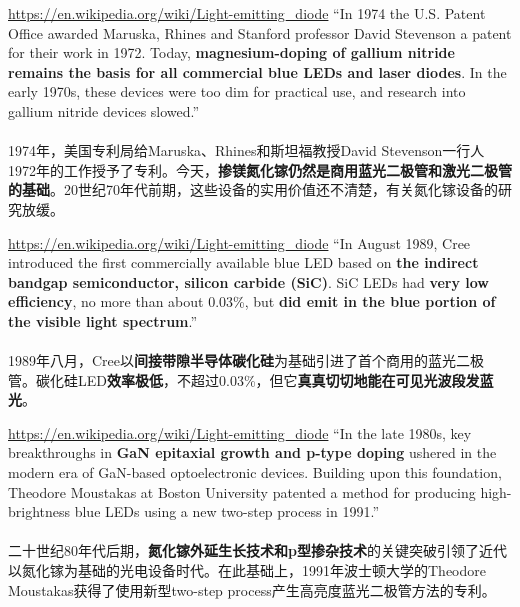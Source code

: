 \begin{slide}{\url{https://en.wikipedia.org/wiki/Light-emitting_diode}}
  ``In 1974 the U.S. Patent Office awarded Maruska, Rhines and Stanford professor David Stevenson a patent for their work in 1972. Today, \textbf{magnesium-doping of gallium nitride remains the basis for all commercial blue LEDs and laser diodes}. In the early 1970s, these devices were too dim for practical use, and research into gallium nitride devices slowed.''
  \\~\\
  1974年，美国专利局给Maruska、Rhines和斯坦福教授David Stevenson一行人1972年的工作授予了专利。今天，\textbf{掺镁氮化镓仍然是商用蓝光二极管和激光二极管的基础}。20世纪70年代前期，这些设备的实用价值还不清楚，有关氮化镓设备的研究放缓。
\end{slide}

\begin{slide}{\url{https://en.wikipedia.org/wiki/Light-emitting_diode}}
  ``In August 1989, Cree introduced the first commercially available blue LED based on \textbf{the indirect bandgap semiconductor, silicon carbide (SiC)}. SiC LEDs had \textbf{very low efficiency}, no more than about 0.03\%, but \textbf{did emit in the blue portion of the visible light spectrum}.''
  \\~\\
  1989年八月，Cree以\textbf{间接带隙半导体碳化硅}为基础引进了首个商用的蓝光二极管。碳化硅LED\textbf{效率极低}，不超过0.03\%，但它\textbf{真真切切地能在可见光波段发蓝光}。
\end{slide}

\begin{slide}{\url{https://en.wikipedia.org/wiki/Light-emitting_diode}}
  ``In the late 1980s, key breakthroughs in \textbf{GaN epitaxial growth and p-type doping} ushered in the modern era of GaN-based optoelectronic devices. Building upon this foundation, Theodore Moustakas at Boston University patented a method for producing high-brightness blue LEDs using a new two-step process in 1991.''
  \\~\\
  二十世纪80年代后期，\textbf{氮化镓外延生长技术和p型掺杂技术}的关键突破引领了近代以氮化镓为基础的光电设备时代。在此基础上，1991年波士顿大学的Theodore Moustakas获得了使用新型two-step process产生高亮度蓝光二极管方法的专利。
\end{slide}


